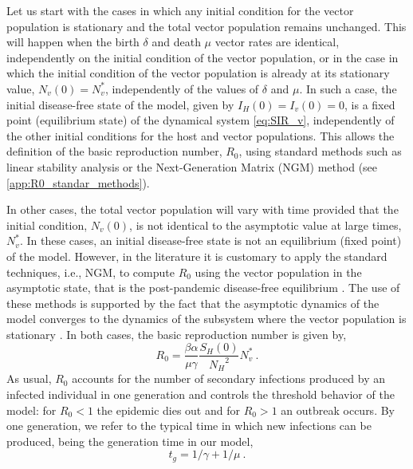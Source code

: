 Let us start with the cases in which any initial condition for the vector
population is stationary  and the total vector population remains unchanged.
This will happen when the birth $\delta$ and death $\mu$ vector rates are
identical, independently on the initial condition of the vector population, or
in the case in which the initial condition of the vector population is already
at its stationary value, $N_v(0)=N_v^*$, independently of the values of
$\delta$ and $\mu$. In such a case, the initial disease-free state of the
model, given by $I_H(0)=I_v(0)=0$, is a fixed point (equilibrium state) of the
dynamical system \cref{eq:SIR_v}, independently of the other initial conditions
for the host and vector populations. This allows the definition of the basic
reproduction number, $R_0$, using standard methods such as linear stability
analysis or the Next-Generation Matrix (NGM) method \cite{Diekmann2010} (see
\cref{app:R0_standar_methods}).

In other cases, the total vector population will vary with time provided
that the initial condition, $N_v(0)$, is not identical to the asymptotic value
at large times, $N_v^*$. In these cases, an initial disease-free state is not
an equilibrium (fixed point) of the model. However, in the literature it is
customary to apply the standard techniques, i.e., NGM, to compute $R_0$ using
the vector population in the asymptotic state, that is the post-pandemic
disease-free equilibrium \cite{Martcheva2008, Lashari2011, Shah2013, Zhao2020,
    Esteva1998}.
The use of these methods is supported by the fact that the asymptotic
dynamics of the model converges to the dynamics of the subsystem where the
vector population is stationary \cite{Thieme1992,Thieme1995}. In both cases,
the basic reproduction number is given by,
\begin{equation}\label{eq:R0_asympt}
    R_0=\frac{\beta\alpha}{\mu\gamma}\frac{S_H(0)}{{N_H}^2}N_v^* \ .
\end{equation}
As usual, $R_0$ accounts for the number of secondary infections produced by
an infected individual in one generation and controls the threshold behavior of
the model: for $R_0<1$ the epidemic dies out and for $R_0>1$ an outbreak
occurs. By one generation, we refer to the typical time in which new infections
can be produced, being the generation time in our model,
\begin{equation}
    t_g=1/\gamma + 1/\mu\ .
    \label{eq:generationtime}
\end{equation}

